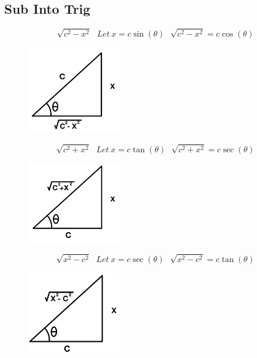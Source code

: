 	\subsection{Sub Into Trig}
	\begin{center}
	    \begin{equation}
	    \label{sin_trig}
    	\sqrt{c^2-x^2}\text{\ \ \ \ } Let\ x=c\sin{(\theta )}\text{\ \ \ \ } \sqrt{c^2-x^2}=c\cos{(\theta )}
    	\end{equation}
    	\begin{figure}[H]
    	\center
    	\includegraphics[width=4cm]{Pictures/sin}
    	\end{figure}
    	
    	\begin{equation}
    	\sqrt{c^2+x^2}\text{\ \ \ \ } Let\ x=c\tan{(\theta )}\text{\ \ \ \ } \sqrt{c^2+x^2}=c\sec{(\theta )}
    	\end{equation}
    	\begin{figure}[H]
    	\center
    	\includegraphics[width=4cm]{Pictures/tan.jpeg}
    	\end{figure}
    	
    	\begin{equation}
    	\sqrt{x^2-c^2}\text{\ \ \ \ } Let\ x=c\sec{(\theta )}\text{\ \ \ \ } \sqrt{x^2-c^2}=c\tan{(\theta )}
    	\end{equation}
    	\begin{figure}[H]
    	\center
    	\includegraphics[width=4cm]{Pictures/sec}
    	\end{figure}
    	

\end{center}

